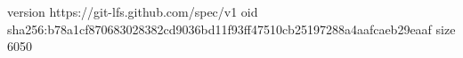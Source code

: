 version https://git-lfs.github.com/spec/v1
oid sha256:b78a1cf870683028382cd9036bd11f93ff47510cb25197288a4aafcaeb29eaaf
size 6050
